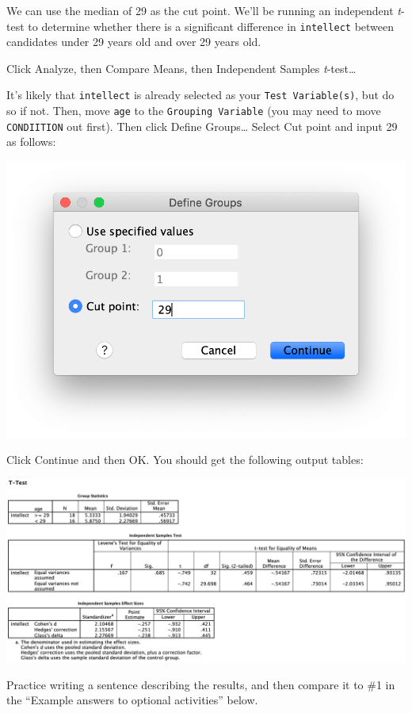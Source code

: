 \documentclass[
]{book}
\begin{document}
We can use the median of 29 as the cut point. We'll be running an independent \emph{t}-test to determine whether there is a significant difference in \texttt{intellect} between candidates under 29 years old and over 29 years old.

Click {Analyze}, then {Compare Means}, then {Independent Samples \emph{t}-test\ldots{}}

It's likely that \texttt{intellect} is already selected as your \texttt{Test\ Variable(s)}, but do so if not. Then, move \texttt{age} to the \texttt{Grouping\ Variable} (you may need to move \texttt{CONDIITION} out first). Then click {Define Groups\ldots{}} Select {Cut point} and input 29 as follows:

\includegraphics{img/7.4.24.png}

Click {Continue} and then {OK}. You should get the following output tables:

\includegraphics{img/7.4.25.png}

Practice writing a sentence describing the results, and then compare it to \#1 in the ``Example answers to optional activities'' below.
\end{document}
